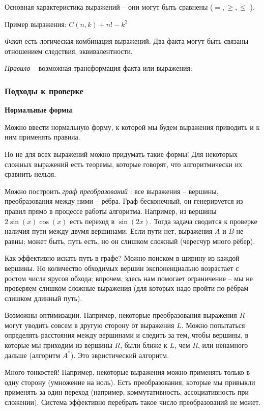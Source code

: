 \documentclass[main.tex]{subfiles}
\begin{document}
Основная характеристика выражений -- они могут быть сравнены ($ =, \ge, \le $ ).


Пример выражения: $ C(n,k) + n! - k^2 $

\emph{ Факт } есть логическая комбинация выражений.
Два факта могут быть связаны отношением следствия, эквивалентности.


\emph{ Правило } -- возможная трансформация факта или выражения:

\subsubsection{ Подходы к проверке }
\textbf{Нормальные формы}.

Можно ввести нормальную форму, к которой мы будем выражения приводить и к ним применять правила.

Но не для всех выражений можно придумать такие формы!
Для некоторых сложных выражений есть теоремы, которые говорят, что алгоритмически их сравнить нельзя.

Можно построить \emph{ граф преобразований }: все выражения -- вершины, преобразования между ними -- рёбра.
Граф бесконечный, он генерируется из правил прямо в процессе работы алгоритма.
Например, из вершины $ 2 \sin(x) \cos(x) $ есть переход в $ \sin(2x) $.
Тогда задача сводится к проверке наличия пути между двумя вершинами.
Если пути нет, выражения $ A $ и $ B $ не равны; может быть, путь есть, но он слишком сложный (чересчур много рёбер).

Как эффективно искать путь в графе?
Можно поиском в ширину из каждой вершины.
Но количество обходимых вершин экспоненциально возрастает с ростом числа ярусов обхода; впрочем, здесь нам помогает ограничение -- мы не проверяем слишком сложные выражения (для которых надо пройти по рёбрам слишком длинный путь).

Возможны оптимизации.
Например, некоторые преобразования выражения $ R $ могут уводить совсем в другую сторону от выражения $ L $.
Можно попытаться определять расстояния между вершинами и следить за тем, чтобы вершины, в которые мы приходим из вершины $ R $, были ближе к $ L $, чем $ R $, или ненамного дальше (алгоритм $ A^* $).
Это эвристический алгоритм.

Много тонкостей!
Например, некоторые выражения можно применять только в одну сторону (умножение на ноль).
Есть преобразования, которые мы привыкли применять за один переход (например, коммутативность, ассоциативность при сложении).
Система эффективно перебрать такое число преобразований не может.
\end{document}
